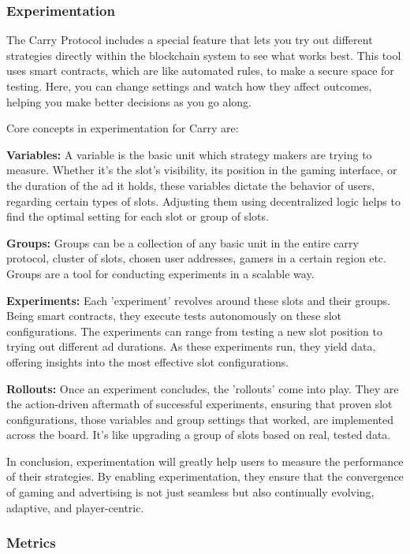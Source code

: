 \subsubsection{Experimentation}


The Carry Protocol includes a special feature that lets you try out different strategies directly within the blockchain system to see what works best. This tool uses smart contracts, which are like automated rules, to make a secure space for testing. Here, you can change settings and watch how they affect outcomes, helping you make better decisions as you go along.

Core concepts in experimentation for Carry are:

\textbf{Variables:} A variable is the basic unit which strategy makers are trying to measure. Whether it's the slot's visibility, its position in the gaming interface, or the duration of the ad it holds, these variables dictate the behavior of users, regarding certain types of slots. Adjusting them using decentralized logic helps to find the optimal setting for each slot or group of slots.

\textbf{Groups:} Groups can be a collection of any basic unit in the entire carry protocol, cluster of slots, chosen user addresses, gamers in a certain region etc. Groups are a tool for conducting experiments in a scalable way.

\textbf{Experiments:} Each 'experiment' revolves around these slots and their groups. Being smart contracts, they execute tests autonomously on these slot configurations. The experiments can range from testing a new slot position to trying out different ad durations. As these experiments run, they yield data, offering insights into the most effective slot configurations.

\textbf{Rollouts:} Once an experiment concludes, the 'rollouts' come into play. They are the action-driven aftermath of successful experiments, ensuring that proven slot configurations, those variables and group settings that worked, are implemented across the board. It's like upgrading a group of slots based on real, tested data.

In conclusion, experimentation will greatly help users to measure the performance of their strategies. By enabling experimentation, they ensure that the convergence of gaming and advertising is not just seamless but also continually evolving, adaptive, and player-centric.

\subsubsection{Metrics}

